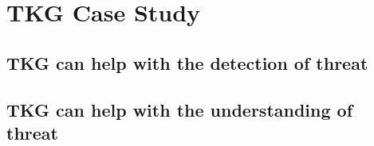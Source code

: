 \section{TKG Case Study}
\label{sec:case_study}

\subsection{TKG can help with the detection of threat}

\subsection{TKG can help with the understanding of threat}
